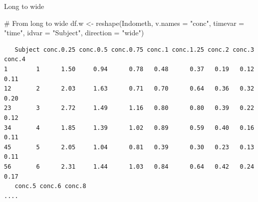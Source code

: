 \documentclass[
  ignorenonframetext,
]{beamer}
\newenvironment{Shaded}{\begin{snugshade}}{\end{snugshade}}
\newcommand{\AttributeTok}[1]{\textcolor[rgb]{0.00,0.34,0.68}{#1}}
\newcommand{\CommentTok}[1]{\textcolor[rgb]{0.54,0.53,0.53}{#1}}
\newcommand{\FunctionTok}[1]{\textcolor[rgb]{0.39,0.29,0.61}{#1}}
\newcommand{\NormalTok}[1]{\textcolor[rgb]{0.12,0.11,0.11}{#1}}
\newcommand{\OtherTok}[1]{\textcolor[rgb]{0.00,0.43,0.16}{#1}}
\newcommand{\StringTok}[1]{\textcolor[rgb]{0.75,0.01,0.01}{#1}}
\begin{document}
\begin{frame}[fragile]{Long to wide}
\protect\hypertarget{long-to-wide}{}
\small

\begin{Shaded}
\begin{Highlighting}[]
\CommentTok{\# From long to wide}
\NormalTok{df.w }\OtherTok{\textless{}{-}} \FunctionTok{reshape}\NormalTok{(Indometh, }\AttributeTok{v.names =} \StringTok{"conc"}\NormalTok{, }\AttributeTok{timevar =} \StringTok{"time"}\NormalTok{,}
    \AttributeTok{idvar =} \StringTok{"Subject"}\NormalTok{, }\AttributeTok{direction =} \StringTok{"wide"}\NormalTok{)}
\end{Highlighting}
\end{Shaded}

\begin{verbatim}
   Subject conc.0.25 conc.0.5 conc.0.75 conc.1 conc.1.25 conc.2 conc.3 conc.4
1        1      1.50     0.94      0.78   0.48      0.37   0.19   0.12   0.11
12       2      2.03     1.63      0.71   0.70      0.64   0.36   0.32   0.20
23       3      2.72     1.49      1.16   0.80      0.80   0.39   0.22   0.12
34       4      1.85     1.39      1.02   0.89      0.59   0.40   0.16   0.11
45       5      2.05     1.04      0.81   0.39      0.30   0.23   0.13   0.11
56       6      2.31     1.44      1.03   0.84      0.64   0.42   0.24   0.17
   conc.5 conc.6 conc.8
....
\end{verbatim}
\end{frame}
\end{document}
